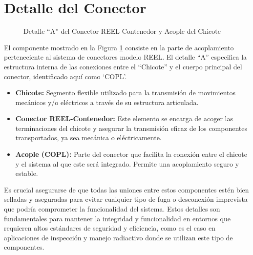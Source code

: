 \section{Detalle del Conector}

\begin{figure}[h!]
    \centering
    \caption{Detalle ``A'' del Conector REEL-Contenedor y Acople del Chicote}
    \label{fig:detalle_a}
\end{figure}

El componente mostrado en la Figura \ref{fig:detalle_a} consiste en la parte de acoplamiento perteneciente al sistema de conectores modelo REEL. El detalle ``A'' especifica la estructura interna de las conexiones entre el ``Chicote'' y el cuerpo principal del conector, identificado aquí como `COPL'.

\begin{itemize}
    \item \textbf{Chicote:} Segmento flexible utilizado para la transmisión de movimientos mecánicos y/o eléctricos a través de su estructura articulada.
    \item \textbf{Conector REEL-Contenedor:} Este elemento se encarga de acoger las terminaciones del chicote y asegurar la transmisión eficaz de los componentes transportados, ya sea mecánica o eléctricamente.
    \item \textbf{Acople (COPL):} Parte del conector que facilita la conexión entre el chicote y el sistema al que este será integrado. Permite una acoplamiento seguro y estable.
\end{itemize}

Es crucial asegurarse de que todas las uniones entre estos componentes estén bien selladas y aseguradas para evitar cualquier tipo de fuga o desconexión imprevista que podría comprometer la funcionalidad del sistema. Estos detalles son fundamentales para mantener la integridad y funcionalidad en entornos que requieren altos estándares de seguridad y eficiencia, como es el caso en aplicaciones de inspección y manejo radiactivo donde se utilizan este tipo de componentes.
